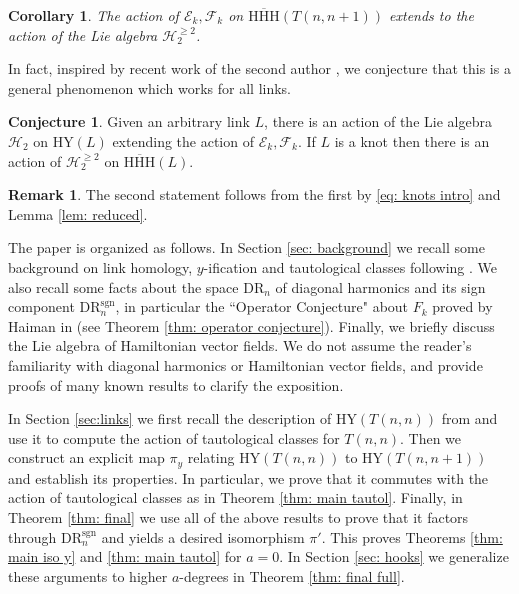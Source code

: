 \documentclass{amsart}
\newcommand{\DR}{\mathrm{DR}}
\newcommand{\HY}{\mathrm{HY}}
\newcommand{\sgn}{\mathrm{sgn}}
\newcommand{\CE}{\mathcal{E}}
\newcommand{\CF}{\mathcal{F}}
\newcommand{\HHH}{\mathrm{HHH}}
\numberwithin{equation}{section}
\newtheorem{corollary}[theorem]{Corollary}
\theoremstyle{definition}
\newtheorem{remark}[theorem]{Remark}
\newtheorem{conjecture}[theorem]{Conjecture}
\begin{document}
\begin{corollary}
\label{cor: main Hamiltonian}
The action of $\CE_k,\CF_k$ on $\overline{\HHH}(T(n,n+1))$ extends to the action of the Lie algebra $\mathcal{H}_2^{\ge 2}$. 
\end{corollary}

In fact, inspired by recent work of the second author \cite{HMMS,ICM}, we conjecture that this is a general phenomenon which works for all links.

\begin{conjecture}
\label{conj: Hamiltonian}
Given an arbitrary link $L$, there is an action of the Lie algebra $\mathcal{H}_2$ on $\HY(L)$ extending the action of $\CE_k,\CF_k$. If $L$ is a knot then there is an action of $\mathcal{H}_2^{\ge 2}$ on $\overline{\HHH}(L)$. 
\end{conjecture}

\begin{remark}
The second statement follows from the first by \eqref{eq: knots intro} and Lemma \ref{lem: reduced}. 
\end{remark}

The paper is organized as follows. In Section \ref{sec: background} we recall some background on link homology, $y$-ification and tautological classes following \cite{GH,GHM}. We also recall some facts about the space $\DR_n$ of diagonal harmonics and its sign component $\DR_n^{\sgn}$, in particular the ``Operator Conjecture" about $F_k$ proved by Haiman in \cite{HaimanInv} (see Theorem \ref{thm: operator conjecture}). Finally, we briefly discuss the Lie algebra of Hamiltonian vector fields. We do not assume the reader's familiarity with diagonal harmonics or Hamiltonian vector fields, and provide proofs of many known results to clarify the exposition.

In Section \ref{sec:links} we first recall the description of $\HY(T(n,n))$ from \cite{GH} and use it to compute the action of tautological classes for $T(n,n)$. Then we construct an explicit map $\pi_y$ relating $\HY(T(n,n))$ to $\HY(T(n,n+1))$ and establish its properties. In particular, we prove that it commutes with the action of tautological classes as in Theorem \ref{thm: main tautol}. Finally, in Theorem \ref{thm: final} we use all of the above results to prove that it factors through $\DR_n^{\sgn}$ and  yields a desired isomorphism $\pi'$. This proves Theorems \ref{thm: main iso y} and \ref{thm: main tautol} for $a=0$. In Section \ref{sec: hooks} we generalize these arguments to higher $a$-degrees in Theorem \ref{thm: final full}.
\end{document}

